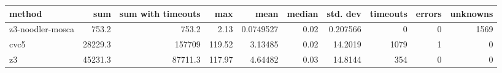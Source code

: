 \begin{tabular}{lrrrrrrrrr}
\hline
 method           &     sum &   sum with timeouts &    max &      mean &   median &   std. dev &   timeouts &   errors &   unknowns \\
\hline
 z3-noodler-mosca &   753.2 &               753.2 &   2.13 & 0.0749527 &     0.02 &   0.207566 &          0 &        0 &       1569 \\
 cvc5             & 28229.3 &            157709   & 119.52 & 3.13485   &     0.02 &  14.2019   &       1079 &        1 &          0 \\
 z3               & 45231.3 &             87711.3 & 117.97 & 4.64482   &     0.03 &  14.8144   &        354 &        0 &          0 \\
\hline
\end{tabular}
